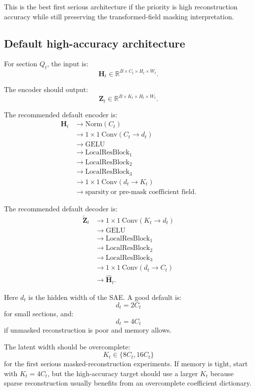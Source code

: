 \documentclass[11pt]{article}
\newcommand{\R}{\mathbb{R}}
\newcommand{\Htens}{\mathbf{H}}
\newcommand{\Ztens}{\mathbf{Z}}
\newcommand{\Hhat}{\widehat{\mathbf{H}}}
\newcommand{\Ztilde}{\widetilde{\mathbf{Z}}}
\begin{document}
This is the best first serious architecture if the priority is high reconstruction accuracy while still preserving the transformed-field masking interpretation.

\subsection{Default high-accuracy architecture}

For section \(Q_t\), the input is:
\[
\Htens_t \in \R^{B \times C_t \times H_t \times W_t}.
\]

The encoder should output:
\[
\Ztens_t \in \R^{B \times K_t \times H_t \times W_t}.
\]

The recommended default encoder is:
\[
\begin{aligned}
\Htens_t
&\rightarrow \mathrm{Norm}(C_t) \\
&\rightarrow 1\times1\ \mathrm{Conv}(C_t \rightarrow d_t) \\
&\rightarrow \mathrm{GELU} \\
&\rightarrow \mathrm{LocalResBlock}_{1} \\
&\rightarrow \mathrm{LocalResBlock}_{2} \\
&\rightarrow \mathrm{LocalResBlock}_{3} \\
&\rightarrow 1\times1\ \mathrm{Conv}(d_t \rightarrow K_t) \\
&\rightarrow \mathrm{sparsity}\ \text{or pre-mask coefficient field}.
\end{aligned}
\]

The recommended default decoder is:
\[
\begin{aligned}
\Ztilde_t
&\rightarrow 1\times1\ \mathrm{Conv}(K_t \rightarrow d_t) \\
&\rightarrow \mathrm{GELU} \\
&\rightarrow \mathrm{LocalResBlock}_{1} \\
&\rightarrow \mathrm{LocalResBlock}_{2} \\
&\rightarrow \mathrm{LocalResBlock}_{3} \\
&\rightarrow 1\times1\ \mathrm{Conv}(d_t \rightarrow C_t) \\
&\rightarrow \Hhat_t.
\end{aligned}
\]

Here \(d_t\) is the hidden width of the SAE. A good default is:
\[
d_t = 2C_t
\]
for small sections, and:
\[
d_t = 4C_t
\]
if unmasked reconstruction is poor and memory allows.

The latent width should be overcomplete:
\[
K_t \in \{8C_t, 16C_t\}
\]
for the first serious masked-reconstruction experiments. If memory is tight, start with \(K_t=4C_t\), but the high-accuracy target should use a larger \(K_t\) because sparse reconstruction usually benefits from an overcomplete coefficient dictionary.
\end{document}

